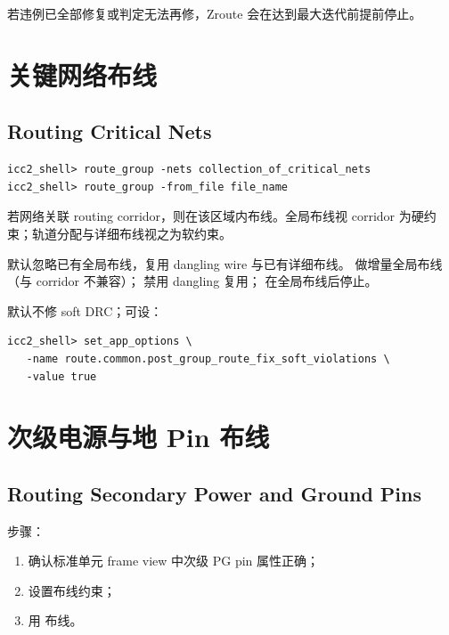\begin{noteBox}
若违例已全部修复或判定无法再修，Zroute 会在达到最大迭代前提前停止。
\end{noteBox}

\section{关键网络布线}
\subsection*{Routing Critical Nets}

\begin{lstlisting}
icc2_shell> route_group -nets collection_of_critical_nets
icc2_shell> route_group -from_file file_name
\end{lstlisting}

若网络关联 routing corridor，则在该区域内布线。全局布线视 corridor 为硬约束；轨道分配与详细布线视之为软约束。

默认忽略已有全局布线，复用 dangling wire 与已有详细布线。 做增量全局布线（与 corridor 不兼容）； 禁用 dangling 复用； 在全局布线后停止。

默认不修 soft DRC；可设：
\begin{lstlisting}
icc2_shell> set_app_options \
   -name route.common.post_group_route_fix_soft_violations \
   -value true
\end{lstlisting}

\section{次级电源与地 Pin 布线}
\subsection*{Routing Secondary Power and Ground Pins}

步骤：
\begin{enumerate}
  \item 确认标准单元 frame view 中次级 PG pin 属性正确；
  \item 设置布线约束；
  \item 用  布线。
\end{enumerate}

